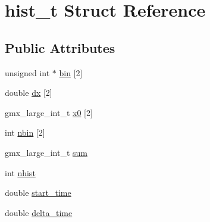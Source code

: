 \hypertarget{structhist__t}{\section{hist\-\_\-t \-Struct \-Reference}
\label{structhist__t}
}
\subsection*{\-Public \-Attributes}
\begin{DoxyCompactItemize}
\item 
unsigned int $\ast$ \hyperlink{structhist__t_ac123566faef138b1b831429f9c45d899}{bin} \mbox{[}2\mbox{]}
\item 
double \hyperlink{structhist__t_a5f5fcefa055ffed70f6b673ff3ee18d6}{dx} \mbox{[}2\mbox{]}
\item 
gmx\-\_\-large\-\_\-int\-\_\-t \hyperlink{structhist__t_a18c9f5177e20cf6fc8ed704a58c5c4ae}{x0} \mbox{[}2\mbox{]}
\item 
int \hyperlink{structhist__t_a98c2cd03eb2e6f1ebe45d7b2b19f3717}{nbin} \mbox{[}2\mbox{]}
\item 
gmx\-\_\-large\-\_\-int\-\_\-t \hyperlink{structhist__t_a1047f38f37cdedd856affb90be397364}{sum}
\item 
int \hyperlink{structhist__t_a50657a4faea2e666341e1213a51a1523}{nhist}
\item 
double \hyperlink{structhist__t_a77d840ca5af08f338c57ad5c1f2ce3ae}{start\-\_\-time}
\item 
double \hyperlink{structhist__t_abc95afe0bd438edcac135ed480a5c7fc}{delta\-\_\-time}
\end{DoxyCompactItemize}


